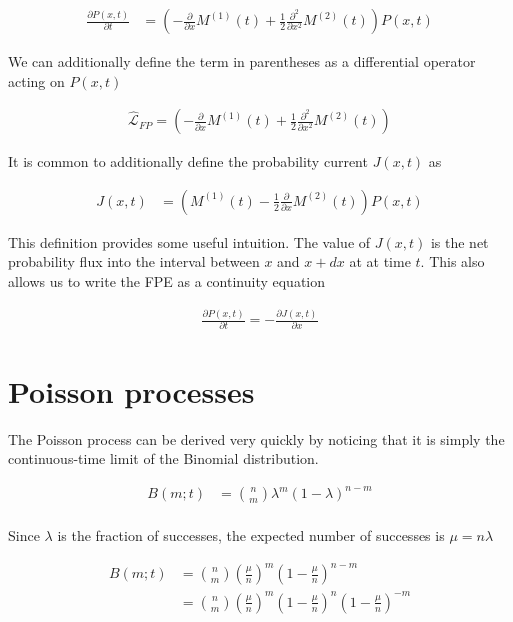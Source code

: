 \documentclass{ucetd}
\begin{document}
\begin{appendices}
\begin{align}
\frac{\partial P(x,t)}{\partial t}  &= \left(-\frac{\partial}{\partial x}M^{(1)}(t) + \frac{1}{2}\frac{\partial^{2}}{\partial x^{2}}M^{(2)}(t)\right)P(x,t)
\end{align}

We can additionally define the term in parentheses as a differential operator acting on $P(x,t)$

\begin{align}
\hat{\mathcal{L}}_{FP} = \left(-\frac{\partial}{\partial x}M^{(1)}(t) + \frac{1}{2}\frac{\partial^{2}}{\partial x^{2}}M^{(2)}(t)\right)
\end{align}

It is common to additionally define the probability current $J(x,t)$ as 

\begin{align}
J(x,t)  &= \left(M^{(1)}(t) - \frac{1}{2}\frac{\partial}{\partial x}M^{(2)}(t)\right)P(x,t)
\end{align}

This definition provides some useful intuition. The value of $J(x,t)$ is the net probability flux into the interval between $x$ and $x+dx$ at at time $t$. This also allows us to write the FPE as a continuity equation

\begin{align}
\frac{\partial P(x,t)}{\partial t} = -\frac{\partial J(x,t)}{\partial x}
\end{align}
\end{appendices}



\section{Poisson processes}

The Poisson process can be derived very quickly by noticing that it is simply the continuous-time limit of the Binomial distribution.

\begin{align*}
B(m;t) &= {n\choose m}\lambda^{m}(1-\lambda)^{n-m}\\
\end{align*}

Since $\lambda$ is the fraction of successes, the expected number of successes is $\mu = n\lambda$

\begin{align*}
B(m;t) &=  {n\choose m}\left(\frac{\mu}{n}\right)^{m}\left(1-\frac{\mu}{n}\right)^{n-m}\\
&= {n\choose m}\left(\frac{\mu}{n}\right)^{m}\left(1-\frac{\mu}{n}\right)^{n}\left(1-\frac{\mu}{n}\right)^{-m}
\end{align*}
\end{document}

